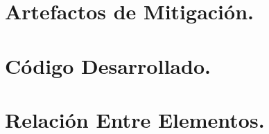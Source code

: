 \documentclass[letterpaper,12pt]{article} %
\numberwithin{equation}{section} %
\numberwithin{figure}{section} %
\numberwithin{table}{section} %
\begin{document}
\setcounter{page}{1} %

\tableofcontents

\newpage
\section{Artefactos de Mitigaci\'on.}

\newpage
\section{C\'odigo Desarrollado.}

\newpage
\section{Relaci\'on Entre Elementos.} %
\end{document}
